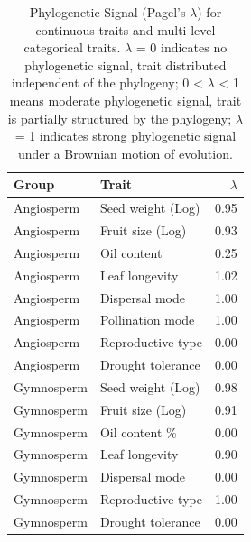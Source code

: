 \documentclass{article}
\begin{document}
\begin{table}[ht]
\centering

\begin{tabular}{llr}
  \hline
Group & Trait & $\lambda$ \\ 
  \hline
Angiosperm & Seed weight (Log) & 0.95 \\ 
  Angiosperm & Fruit size (Log) & 0.93 \\ 
  Angiosperm & Oil content & 0.25 \\ 
  Angiosperm & Leaf longevity & 1.02 \\ 
  Angiosperm & Dispersal mode & 1.00 \\ 
  Angiosperm & Pollination mode & 1.00 \\ 
  Angiosperm & Reproductive type & 0.00 \\ 
  Angiosperm & Drought tolerance & 0.00 \\ 
  Gymnosperm & Seed weight (Log) & 0.98 \\ 
  Gymnosperm & Fruit size (Log) & 0.91 \\ 
  Gymnosperm & Oil content \% & 0.00 \\ 
  Gymnosperm & Leaf longevity & 0.90 \\ 
  Gymnosperm & Dispersal mode & 0.00 \\ 
  Gymnosperm & Reproductive type & 1.00 \\ 
  Gymnosperm & Drought tolerance & 0.00 \\ 
   \hline
\end{tabular}
\caption{Phylogenetic Signal (Pagel's $\lambda$) for continuous traits and multi-level categorical traits. $\lambda$ = 0 indicates no phylogenetic signal, trait distributed independent of the phylogeny; 0 < $\lambda$ < 1 means moderate phylogenetic signal, trait is partially structured by the phylogeny; $\lambda$ = 1 indicates strong phylogenetic signal under a Brownian motion of evolution.}
\label{tab:lambda}
\end{table}
\end{document}
